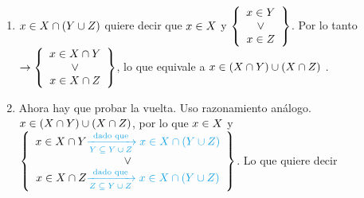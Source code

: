 \begin{enumerate}[label=\arabic*)]
	\item
	      $x \en X \inter (Y \union Z)$ quiere decir que $x \en X$ y
	      $\llaves{c}{
			      x \en Y \\
			      \o      \\
			      x \en Z
		      } $.
	      Por lo tanto $\to
		      \llaves{c}{
			      x \en X \inter Y\\
			      \o \\
			      x \en X \inter Z
		      }$, lo que equivale a $x \en (X \inter Y) \union (X \inter Z)$ \Tilde.\\

	\item
	      Ahora hay que probar la vuelta. Uso razonamiento análogo.
	      $x \en (X \inter Y) \union (X \inter Z)$, por lo que $x \en X$ y
	      $
		      \llaves{c}{
			      x \en X \inter Y \blue{\flecha{dado que}[$Y \subseteq Y \union Z$] x \en X \inter (Y \union Z) }\\
			      \o               \\
			      x \en X \inter Z \blue{\flecha{dado que}[$Z \subseteq Y \union Z$] x \en X \inter (Y \union Z)}
		      }$.
	      Lo que quiere decir \\
	      \\

\end{enumerate}

